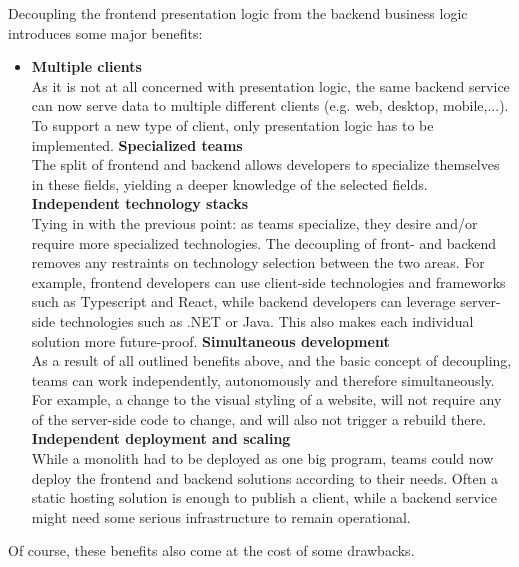 Decoupling the frontend presentation logic from the \gls{backend} business logic
introduces some major benefits: \autocite{Dunkley_2016}
\begin{itemize}
    \item \textbf{Multiple clients}\\
    As it is not at all concerned with presentation logic, the same
    \gls{backend} service can now serve data to multiple different clients (e.g.
    web, desktop, mobile,...). To support a new type of client, only
    presentation logic has to be implemented.
    \spacedItem  \textbf{Specialized teams}\\
    The split of \gls{frontend} and \gls{backend} allows developers to
    specialize themselves in these fields, yielding a deeper knowledge of the
    selected fields. 
    \spacedItem  \textbf{Independent technology stacks}\\
    Tying in with the previous point: as teams specialize, they desire and/or
    require more specialized technologies. The decoupling of front- and
    \gls{backend} removes any restraints on technology selection between the two
    areas. For example, \gls{frontend} developers can use client-side
    technologies and frameworks such as Typescript and React, while
    \gls{backend} developers can leverage server-side technologies such as .NET
    or Java. This also makes each individual solution more future-proof.
    \spacedItem  \textbf{Simultaneous development}\\
    As a result of all outlined benefits above, and the basic concept of
    decoupling, teams can work independently, autonomously and therefore
    simultaneously. For example, a change to the visual styling of a website,
    will not require any of the server-side code to change, and will also not
    trigger a rebuild there. 
    \spacedItem  \textbf{Independent deployment and scaling}\\
    While a \gls{monolith} had to be deployed as one big program, teams could now
    deploy the \gls{frontend} and \gls{backend} solutions according to their
    needs. Often a static hosting solution is enough to publish a client, while
    a \gls{backend} service might need some serious infrastructure to remain
    operational.
\end{itemize}


Of course, these benefits also come at the cost of some drawbacks. 

